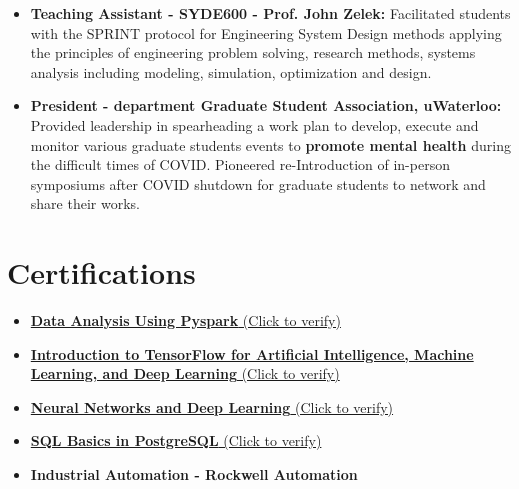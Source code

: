 \documentclass{ExpressiveResume}
\begin{document}
\begin{itemize}
\item {\textbf{Teaching Assistant - SYDE600 - Prof. John Zelek:} Facilitated students with the SPRINT protocol for Engineering System Design methods applying the principles of engineering problem solving, research methods, systems analysis including modeling, simulation, optimization and design.}
\item {\textbf{\textcolor{link_blue}{President} - department \textcolor{link_blue}{Graduate Student Association}, uWaterloo:} Provided leadership in spearheading a work plan to develop, execute and monitor various graduate students events to \textbf{\textcolor{link_blue}{promote mental health}} during the difficult times of COVID. Pioneered re-Introduction of in-person symposiums after COVID shutdown for graduate students to network and share their works.}
\newline


\end{itemize}


\section{\textcolor{link_blue}{Certifications}}
\begin{itemize}
\item {\href{https://www.coursera.org/account/accomplishments/verify/SHVAW7RTNWF2}{\textbf{Data Analysis Using Pyspark} (Click to verify)}}
\item {\href{https://www.coursera.org/account/accomplishments/verify/C7C8CPGARXJW?utm_source=link&utm_medium=certificate&utm_content=cert_image&utm_campaign=pdf_header_button&utm_product=course}{\textbf{Introduction to TensorFlow for Artificial Intelligence, Machine Learning, and Deep Learning} (Click to verify)}}
\item {\href{https://www.coursera.org/account/accomplishments/verify/ZRBWP4ZFF8YX}{\textbf{Neural Networks and Deep Learning} (Click to verify)}}
\item {\href{https://learnsql.com/files/course-certificate/dcQdkgNWcDbdVjeWXGwKXFTHqxkLQXbYCCJYexdB}{\textbf{SQL Basics in PostgreSQL} (Click to verify)}}
\item {\textbf{Industrial Automation - Rockwell Automation}}
\newline

\end{itemize}
\end{document}
